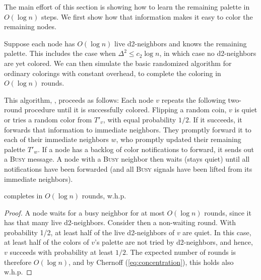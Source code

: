 The main effort of this section is showing how to learn the remaining palette in $O(\log n)$ steps.
We first show how that information makes it easy to color the remaining nodes.

%
Suppose each node has $O(\log n)$ live d2-neighbors and knows the remaining palette. This includes the case when $\Delta^2 \le c_2\log n$, in which case no d2-neighbors are yet colored. 
We can then simulate the basic randomized algorithm for ordinary colorings with constant overhead, to complete the coloring in $O(\log n)$ rounds.

This algorithm, , proceeds as follows:
Each node $v$ repeats the following two-round procedure until it is successfully colored. 
Flipping a random coin, $v$ is quiet or tries a random color from $T'_v$, with equal probability $1/2$.
If it succeeds, it forwards that information to immediate neighbors. They promptly forward it to each of their immediate neighbors $w$, who promptly updated their remaining palette $T'_w$. If a node has a backlog of color notifications to forward, it sends out a \textsc{Busy} message. A node with a \textsc{Busy} neighbor then waits (stays quiet) until all notifications have been forwarded (and all \textsc{Busy} signals have been lifted from its immediate neighbors). 

\begin{lemma}
 completes in $O(\log n)$ rounds, w.h.p.
\label{l:step7}
\end{lemma}

\begin{proof}
A node waits for a busy neighbor for at most $O(\log n)$ rounds, since it has that many live d2-neighbors.
Consider then a non-waiting round.
With probability 1/2, at least half of the live d2-neighbors of $v$ are quiet. In this case, at least half of the colors of $v$'s palette are not tried by d2-neighbors, and hence, $v$ succeeds with probability at least $1/2$. The expected number of rounds is therefore $O(\log n)$, and by Chernoff (\ref{eq:concentration}), this holds also w.h.p.
\end{proof}

